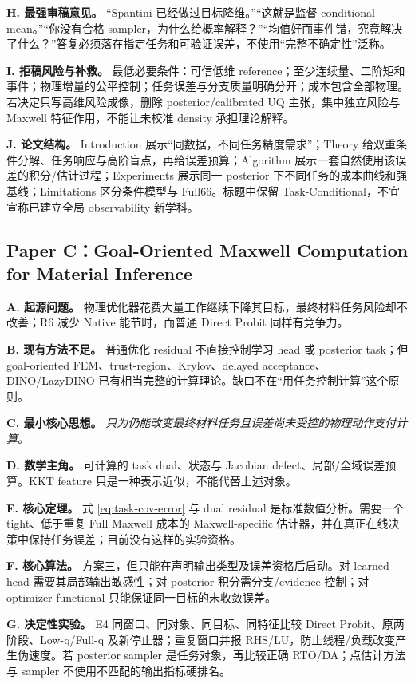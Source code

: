 \textbf{H. 最强审稿意见。} “Spantini 已经做过目标降维。”“这就是监督 conditional mean。”“你没有合格 sampler，为什么给概率解释？”“均值好而事件错，究竟解决了什么？”答复必须落在指定任务和可验证误差，不使用“完整不确定性”泛称。

\textbf{I. 拒稿风险与补救。} 最低必要条件：可信低维 reference；至少连续量、二阶矩和事件；物理增量的公平控制；任务误差与分支质量明确分开；成本包含全部物理。若决定只写高维风险成像，删除 posterior/calibrated UQ 主张，集中独立风险与 Maxwell 特征作用，不能让未校准 density 承担理论解释。

\textbf{J. 论文结构。} Introduction 展示“同数据，不同任务精度需求”；Theory 给双重条件分解、任务响应与高阶盲点，再给误差预算；Algorithm 展示一套自然使用该误差的积分/估计过程；Experiments 展示同一 posterior 下不同任务的成本曲线和强基线；Limitations 区分条件模型与 Full66。标题中保留 Task-Conditional，不宜宣称已建立全局 observability 新学科。

\subsection{Paper C：Goal-Oriented Maxwell Computation for Material Inference}
\textbf{A. 起源问题。} 物理优化器花费大量工作继续下降其目标，最终材料任务风险却不改善；R6 减少 Native 能节时，而普通 Direct Probit 同样有竞争力。

\textbf{B. 现有方法不足。} 普通优化 residual 不直接控制学习 head 或 posterior task；但 goal-oriented FEM、trust-region、Krylov、delayed acceptance、DINO/LazyDINO 已有相当完整的计算理论。缺口不在“用任务控制计算”这个原则。

\textbf{C. 最小核心思想。} \emph{只为仍能改变最终材料任务且误差尚未受控的物理动作支付计算。}

\textbf{D. 数学主角。} 可计算的 task dual、状态与 Jacobian defect、局部/全域误差预算。KKT feature 只是一种表示近似，不能代替上述对象。

\textbf{E. 核心定理。} 式 \eqref{eq:task-cov-error} 与 dual residual 是标准数值分析。需要一个 tight、低于重复 Full Maxwell 成本的 Maxwell-specific 估计器，并在真正在线决策中保持任务误差；目前没有这样的实验资格。

\textbf{F. 核心算法。} 方案三，但只能在声明输出类型及误差资格后启动。对 learned head 需要其局部输出敏感性；对 posterior 积分需分支/evidence 控制；对 optimizer functional 只能保证同一目标的未收敛误差。

\textbf{G. 决定性实验。} E4 同窗口、同对象、同目标、同特征比较 Direct Probit、原两阶段、Low-q/Full-q 及新停止器；重复窗口并报 RHS/LU，防止线程/负载改变产生伪速度。若 posterior sampler 是任务对象，再比较正确 RTO/DA；点估计方法与 sampler 不使用不匹配的输出指标硬排名。

